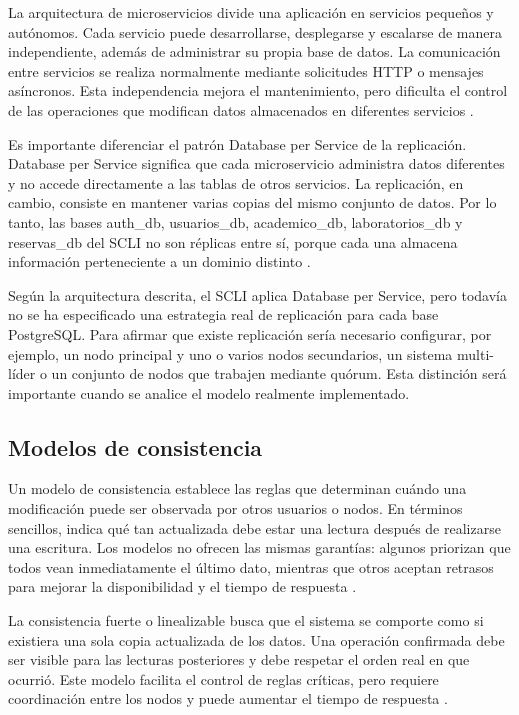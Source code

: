 \documentclass[conference]{IEEEtran}
\begin{document}
La arquitectura de microservicios divide una aplicación en servicios pequeños y autónomos. Cada servicio puede desarrollarse, desplegarse y escalarse de manera independiente, además de administrar su propia base de datos. La comunicación entre servicios se realiza normalmente mediante solicitudes HTTP o mensajes asíncronos. Esta independencia mejora el mantenimiento, pero dificulta el control de las operaciones que modifican datos almacenados en diferentes servicios \cite{ref2}.

Es importante diferenciar el patrón Database per Service de la replicación. Database per Service significa que cada microservicio administra datos diferentes y no accede directamente a las tablas de otros servicios. La replicación, en cambio, consiste en mantener varias copias del mismo conjunto de datos. Por lo tanto, las bases auth\_db, usuarios\_db, academico\_db, laboratorios\_db y reservas\_db del SCLI no son réplicas entre sí, porque cada una almacena información perteneciente a un dominio distinto \cite{ref1,ref2}.

Según la arquitectura descrita, el SCLI aplica Database per Service, pero todavía no se ha especificado una estrategia real de replicación para cada base PostgreSQL. Para afirmar que existe replicación sería necesario configurar, por ejemplo, un nodo principal y uno o varios nodos secundarios, un sistema multi-líder o un conjunto de nodos que trabajen mediante quórum. Esta distinción será importante cuando se analice el modelo realmente implementado.

\subsection{Modelos de consistencia}
Un modelo de consistencia establece las reglas que determinan cuándo una modificación puede ser observada por otros usuarios o nodos. En términos sencillos, indica qué tan actualizada debe estar una lectura después de realizarse una escritura. Los modelos no ofrecen las mismas garantías: algunos priorizan que todos vean inmediatamente el último dato, mientras que otros aceptan retrasos para mejorar la disponibilidad y el tiempo de respuesta \cite{ref1}.

La consistencia fuerte o linealizable busca que el sistema se comporte como si existiera una sola copia actualizada de los datos. Una operación confirmada debe ser visible para las lecturas posteriores y debe respetar el orden real en que ocurrió. Este modelo facilita el control de reglas críticas, pero requiere coordinación entre los nodos y puede aumentar el tiempo de respuesta \cite{ref1,ref4}.
\end{document}
